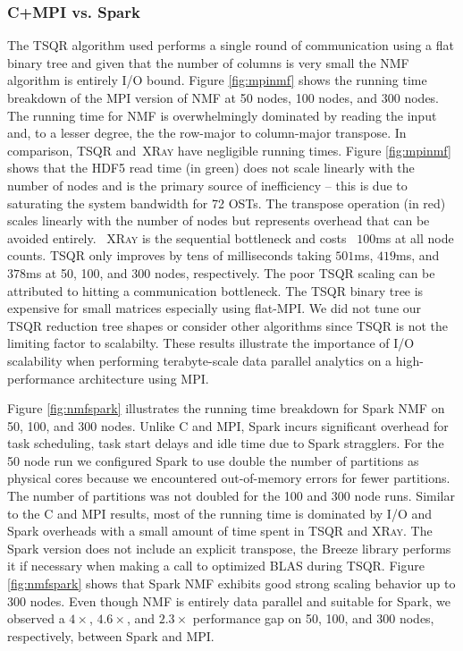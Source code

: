 \subsubsection{C+MPI vs. Spark}
The TSQR algorithm used performs a single round of communication using a flat binary tree and given that the number of columns is very small the NMF algorithm is entirely I/O bound. Figure \ref{fig:mpinmf} shows the running time breakdown of the MPI version of NMF at 50 nodes, 100 nodes, and 300 nodes. The running time for NMF is overwhelmingly dominated by reading the input and, to a lesser degree, the the row-major to column-major transpose. In comparison, TSQR and~\textsc{XRay} have negligible running times. Figure \ref{fig:mpinmf} shows that the HDF5 read time (in green) does not scale linearly with the number of nodes and is the primary source of inefficiency -- this is due to saturating the system bandwidth for 72 OSTs. The transpose operation (in red) scales linearly with the number of nodes but represents overhead that can be avoided entirely. ~\textsc{XRay} is the sequential bottleneck and costs ~$100$ms at all node counts. TSQR only improves by tens of milliseconds taking $501$ms, $419$ms, and $378$ms at 50, 100, and 300 nodes, respectively. The poor TSQR scaling can be attributed to hitting a communication bottleneck. The TSQR  binary tree is expensive for small matrices especially using flat-MPI. We did not tune our TSQR reduction tree shapes or consider other algorithms since TSQR is not the limiting factor to scalabilty. These results illustrate the importance of I/O scalability when performing terabyte-scale data parallel analytics on a high-performance architecture using MPI.

Figure \ref{fig:nmfspark} illustrates the running time breakdown for Spark NMF on 50, 100, and 300 nodes. Unlike C and MPI, Spark incurs significant overhead for task scheduling, task start delays and idle time due to Spark stragglers. For the 50 node run we configured Spark to use double the number of partitions as physical cores because we encountered out-of-memory errors for fewer partitions. The number of partitions was not doubled for the 100 and 300 node runs. Similar to the C and MPI results, most of the running time is dominated by I/O and Spark overheads with a small amount of time spent in TSQR and \textsc{XRay}. The Spark version does not include an explicit transpose, the Breeze library performs it if necessary when making a call to optimized BLAS during TSQR. Figure \ref{fig:nmfspark} shows that Spark NMF exhibits good strong scaling behavior up to 300 nodes.  Even though NMF is entirely data parallel and suitable for Spark, we observed a $4\times$, $4.6\times$, and $2.3\times$ performance gap on 50, 100, and 300 nodes, respectively, between Spark and MPI.

